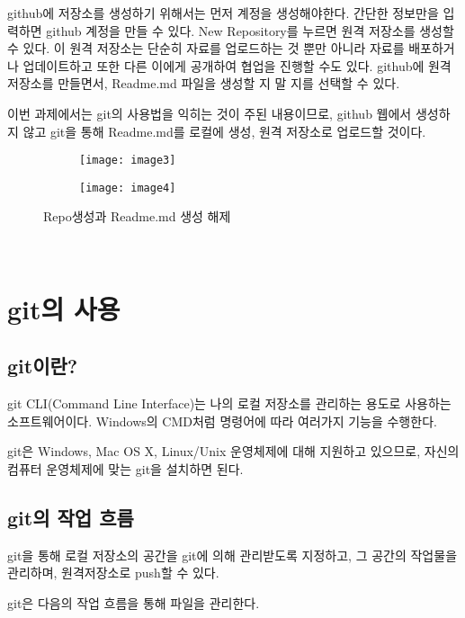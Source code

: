\documentclass[titlepage]{article}
\begin{document}
			github에 저장소를 생성하기 위해서는 먼저 계정을 생성해야한다. 간단한 정보만을 입력하면
github 계정을 만들 수 있다.
New Repository를 누르면 원격 저장소를 생성할 수 있다. 이 원격 저장소는 단순히 자료를 업로드하는 것
뿐만 아니라 자료를 배포하거나 업데이트하고 또한 다른 이에게 공개하여 협업을 진행할 수도 있다.
github에 원격저장소를 만들면서, Readme.md 파일을 생성할 지 말 지를 선택할 수 있다.
\par
\noindent 이번 과제에서는 git의 사용법을 익히는 것이 주된 내용이므로, github 웹에서 생성하지 않고 
git을 통해 Readme.md를 로컬에 생성, 원격 저장소로 업로드할 것이다.\\
		\begin{figure}[h]
 
		\begin{subfigure}{0.5\textwidth}
		\texttt{[image: image3]} 
		\end{subfigure}
		\begin{subfigure}{0.5\textwidth}
		\texttt{[image: image4]}
		
	
		\end{subfigure}
 
		\caption{Repo생성과 Readme.md 생성 해제}
		\label{fig:figure2}
		\end{figure}
		\\
	
\section{git의 사용}
	
		\subsection{ git이란?}
		git CLI(Command Line Interface)는 나의 로컬 저장소를 관리하는 용도로 사용하는 소프트웨어이다.
Windows의 CMD처럼 명령어에 따라 여러가지 기능을 수행한다.
\par
\noindent git은 Windows, Mac OS X, Linux/Unix 운영체제에 대해 지원하고 있으므로, 
자신의 컴퓨터 운영체제에 맞는 git을 설치하면 된다.\\
		\subsection{git의 작업 흐름}
	
		git을 통해 로컬 저장소의 공간을 git에 의해 관리받도록 지정하고,
그 공간의 작업물을 관리하며, 원격저장소로 push할 수 있다. 
\par
\noindent git은 다음의 작업 흐름을 통해 파일을 관리한다.\\
		
\end{document}
